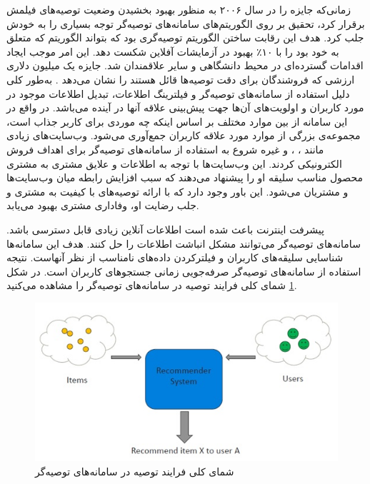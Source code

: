 زمانی‌که
جایزه 
را در سال ۲۰۰۶ به منظور بهبود بخشیدن وضعیت توصیه‌های فیلمش برقرار کرد، تحقیق بر روی الگوریتم‌های سامانه‌های توصیه‌گر توجه بسیاری را به خودش جلب کرد. هدف این رقابت ساختن الگوریتم توصیه‌گری بود که بتواند الگوریتم
که متعلق به خود
بود را با ۱۰٪ بهبود در آزمایشات آفلاین شکست دهد. این امر موجب ایجاد اقدامات گسترده‌ای در محیط دانشگاهی و سایر علاقمندان شد. جایزه یک میلیون دلاری ارزشی که فروشندگان برای دقت توصیه‌ها قائل هستند را نشان می‌دهد
\cite{HCI-009}.
به‌طور کلی دلیل استفاده از سامانه‌های توصیه‌گر و فیلترینگ اطلاعات، تبدیل اطلاعات موجود در مورد کاربران و اولویت‌های آن‌ها جهت پیش‌بینی علاقه آنها در آینده می‌باشد. در واقع در این سامانه از بین موارد مختلف بر اساس اینکه چه موردی برای کاربر جذاب است، مجموعه‌ی بزرگی از موارد مورد علاقه کاربران جمع‌آوری می‌شود. وب‌سایت‌های زیادی مانند
، ، 
و غیره شروع به استفاده از سامانه‌های توصیه‌گر برای اهداف فروش الکترونیکی کردند. این وب‌سایت‌ها با توجه به اطلاعات و علایق مشتری به مشتری محصول مناسب سلیقه او را پیشنهاد می‌دهند که سبب افزایش رابطه میان وب‌سایت‌ها و مشتریان می‌شود. این باور وجود دارد که با ارائه توصیه‌های با کیفیت به مشتری و جلب رضایت او، وفاداری مشتری بهبود می‌یابد.

پیشرفت اینترنت باعث شده است اطلاعات آنلاین زیادی قابل دسترسی باشد. سامانه‌های توصیه‌گر می‌توانند مشکل انباشت اطلاعات را حل کنند. هدف این سامانه‌ها شناسایی سلیقه‌های کاربران و فیلترکردن داده‌های نامناسب از نظر آنهاست. نتیجه استفاده از سامانه‌های توصیه‌گر صرفه‌جویی زمانی جستجوهای کاربران است.
در شکل
\ref{recom1}
شمای کلی فرایند توصیه در سامانه‌های توصیه‌گر را مشاهده می‌کنید.


\begin{figure}
	\centering
	\includegraphics[scale=0.8]{section2/Recom1.jpg}
	\caption{شمای کلی فرایند توصیه در سامانه‌های توصیه‌گر}
	\label{recom1}
\end{figure}

